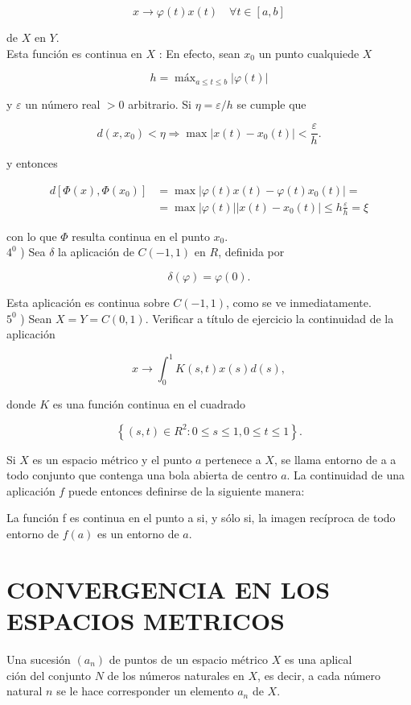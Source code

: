 \documentclass[10pt]{article}
\theoremstyle{plain}
\theoremstyle{definition}
\theoremstyle{remark}
\begin{document}
$$
x \rightarrow \varphi(t) x(t) \quad \forall t \in[a, b]
$$

de $X$ en $Y$.\\
Esta función es continua en $X$ : En efecto, sean $x_{0}$ un punto cualquiede $X$

$$
h=\operatorname{máx}_{a \leqslant t \leqslant b}|\varphi(t)|
$$

y $\varepsilon$ un número real $>0$ arbitrario. Si $\eta=\varepsilon / h$ se cumple que


$$
d\left(x, x_{0}\right)<\eta \Rightarrow \max \left|x(t)-x_{0}(t)\right|<\frac{\varepsilon}{h} .
$$

y entonces

$$
\begin{aligned}
d\left[\Phi(x), \Phi\left(x_{0}\right)\right] & =\max \left|\varphi(t) x(t)-\varphi(t) x_{0}(t)\right|= \\
& =\max |\varphi(t)|\left|x(t)-x_{0}(t)\right| \leqslant h \frac{\varepsilon}{h}=\xi
\end{aligned}
$$

con lo que $\Phi$ resulta continua en el punto $x_{0}$.\\
$4^{0}$ ) Sea $\delta$ la aplicación de $C(-1,1)$ en $R$, definida por

$$
\delta(\varphi)=\varphi(0) .
$$

Esta aplicación es continua sobre $C(-1,1)$, como se ve inmediatamente.\\
$5^{0}$ ) Sean $X=Y=C(0,1)$. Verificar a título de ejercicio la continuidad de la aplicación

$$
x \rightarrow \int_{0}^{1} K(s, t) x(s) d(s),
$$

donde $K$ es una función continua en el cuadrado

$$
\left\{(s, t) \in R^{2}: 0 \leqslant s \leqslant 1,0 \leqslant t \leqslant 1\right\} .
$$

Si $X$ es un espacio métrico y el punto $a$ pertenece a $X$, se llama entorno de a a todo conjunto que contenga una bola abierta de centro $a$. La continuidad de una aplicación $f$ puede entonces definirse de la siguiente manera:

La función f es continua en el punto a si, y sólo si, la imagen recíproca de todo entorno de $f(a)$ es un entorno de $a$.

\section*{CONVERGENCIA EN LOS ESPACIOS METRICOS}
Una sucesión $\left(a_{n}\right)$ de puntos de un espacio métrico $X$ es una aplical\\
ción del conjunto $N$ de los números naturales en $X$, es decir, a cada número natural $n$ se le hace corresponder un elemento $a_{n}$ de $X$.
\end{document}
